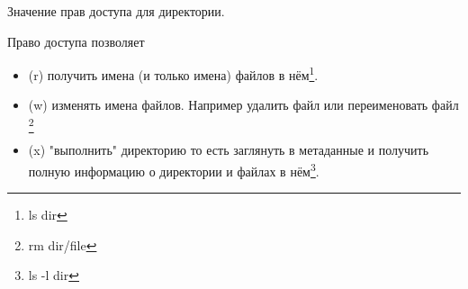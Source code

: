 \begin{frame}{Значение прав доступа для директории.}
  \begin{block}{Право доступа позволяет}
    \begin{itemize}
      \item \alert{(r)} получить имена (и только имена) файлов в нём\footnote{ls dir}. 
      \item \alert{(w)} изменять имена файлов. Например удалить файл или переименовать файл \footnote{rm dir/file} 
      \item \alert{(x)} "выполнить" директорию\newline
	то есть заглянуть в метаданные  и получить полную информацию о директории и файлах в нём\footnote{ls -l dir}.
    \end{itemize}
  \end{block}
\end{frame}
